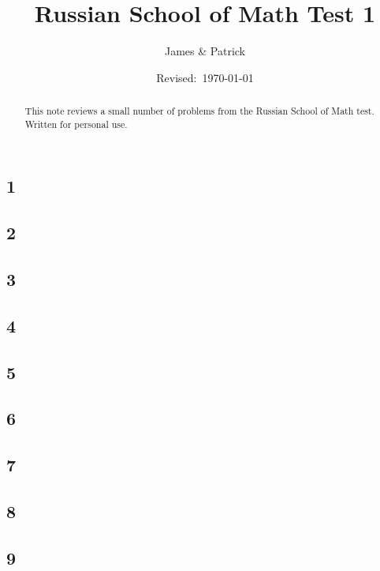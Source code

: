 \documentclass[12pt]{article}
\title{Russian School of Math Test 1}
\author{James \& Patrick}
\date{Revised:~\today}
\begin{document}
\maketitle
\begin{abstract}\setlength{\parindent}{0pt}%
This note reviews a small number of problems from the Russian School of Math test. Written for personal use.
\end{abstract}

\thispagestyle{empty}
\clearpage

\subsection*{1}


\subsection*{2}


\subsection*{3}


\subsection*{4}


\subsection*{5}


\subsection*{6}


\subsection*{7}


\subsection*{8}


\subsection*{9}

\end{document}
